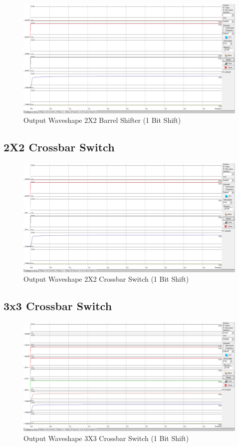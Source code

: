 \documentclass[a4paper,12pt]{article}
\begin{document}
		\begin{figure}[H]
		\centering
		\includegraphics[width=1\linewidth, height=.4\textheight]{Images/2bs1}
		\caption{Output Waveshape 2X2 Barrel Shifter (1 Bit Shift)}
		\label{fig:2b}
	\end{figure}
	
	
	\subsection{2X2 Crossbar Switch}
		\begin{figure}[H]
		\centering
		\includegraphics[width=1\linewidth, height=.39\textheight]{Images/2cs1}
		\caption{Output Waveshape 2X2 Crossbar Switch (1 Bit Shift)}
		\label{fig:2b}
	\end{figure}
	\subsection{3x3 Crossbar Switch}
		\begin{figure}[H]
		\centering
		\includegraphics[width=1\linewidth, height=.41\textheight]{Images/3cs2}
		\caption{Output Waveshape 3X3 Crossbar Switch (1 Bit Shift)}
		\label{fig:2b}
	\end{figure}
\end{document}
